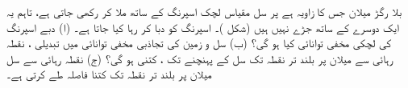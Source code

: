 بلا رگڑ میلان جس کا زاویہ  ہے پر   سل     مقیاس لچک اسپرنگ کے ساتھ  ملا کر رکھی  جاتی ہے، تاہم یہ ایک دوسرے کے ساتھ جڑے نہیں ہیں  (شکل )۔ اسپرنگ کو  دبا کر رہا کیا جاتا ہے۔ (ا)  دبے اسپرنگ کی لچکی مخفی توانائی کیا ہو گی؟ (ب)     سل و  زمین کی تجاذبی مخفی توانائی میں تبدیلی ، نقطہ رہائی سے  میلان پر بلند تر  نقطہ تک سل کے   پہنچنے تک ، کتنی  ہو گی؟ (ج)  نقطہ رہائی سے سل میلان پر بلند تر نقطہ تک کتنا فاصلہ طے کرتی ہے۔
